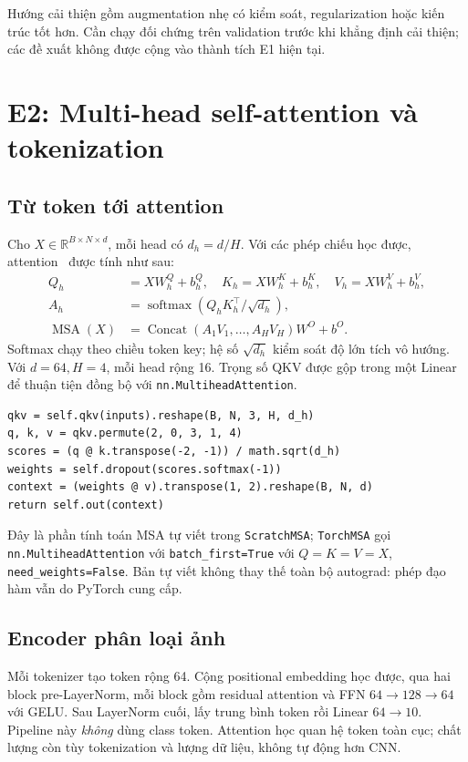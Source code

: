\documentclass[11pt,a4paper]{article}
\begin{document}
Hướng cải thiện gồm augmentation nhẹ có kiểm soát, regularization hoặc kiến trúc tốt hơn. Cần chạy đối chứng trên validation trước khi khẳng định cải thiện; các đề xuất không được cộng vào thành tích E1 hiện tại.
\clearpage

\section{E2: Multi-head self-attention và tokenization}\label{sec:e2}
\subsection{Từ token tới attention}
Cho $X\in\mathbb R^{B\times N\times d}$, mỗi head có $d_h=d/H$. Với các phép chiếu học được, attention~\cite{attention} được tính như sau:
\begin{align}
Q_h&=XW_h^Q+b_h^Q,\quad K_h=XW_h^K+b_h^K,\quad V_h=XW_h^V+b_h^V,\\
A_h&=\operatorname{softmax}\left(Q_hK_h^\top/\sqrt{d_h}\right),\\
\operatorname{MSA}(X)&=\operatorname{Concat}(A_1 V_1,\ldots,A_HV_H)W^O+b^O.
\end{align}
Softmax chạy theo chiều token key; hệ số $\sqrt{d_h}$ kiểm soát độ lớn tích vô hướng. Với $d=64,H=4$, mỗi head rộng 16. Trọng số QKV được gộp trong một Linear để thuận tiện đồng bộ với \texttt{nn.MultiheadAttention}.
\begin{lstlisting}
qkv = self.qkv(inputs).reshape(B, N, 3, H, d_h)
q, k, v = qkv.permute(2, 0, 3, 1, 4)
scores = (q @ k.transpose(-2, -1)) / math.sqrt(d_h)
weights = self.dropout(scores.softmax(-1))
context = (weights @ v).transpose(1, 2).reshape(B, N, d)
return self.out(context)
\end{lstlisting}
Đây là phần tính toán MSA tự viết trong \texttt{ScratchMSA}; \texttt{TorchMSA} gọi \texttt{nn.MultiheadAttention} với \texttt{batch\_first=True} với $Q=K=V=X$, \texttt{need\_weights=False}. Bản tự viết không thay thế toàn bộ autograd: phép đạo hàm vẫn do PyTorch cung cấp.

\subsection{Encoder phân loại ảnh}
Mỗi tokenizer tạo token rộng 64. Cộng positional embedding học được, qua hai block pre-LayerNorm, mỗi block gồm residual attention và FFN $64\to 128\to 64$ với GELU. Sau LayerNorm cuối, lấy trung bình token rồi Linear $64\to 10$. Pipeline này \emph{không} dùng class token. Attention học quan hệ token toàn cục; chất lượng còn tùy tokenization và lượng dữ liệu, không tự động hơn CNN.
\clearpage
\end{document}
